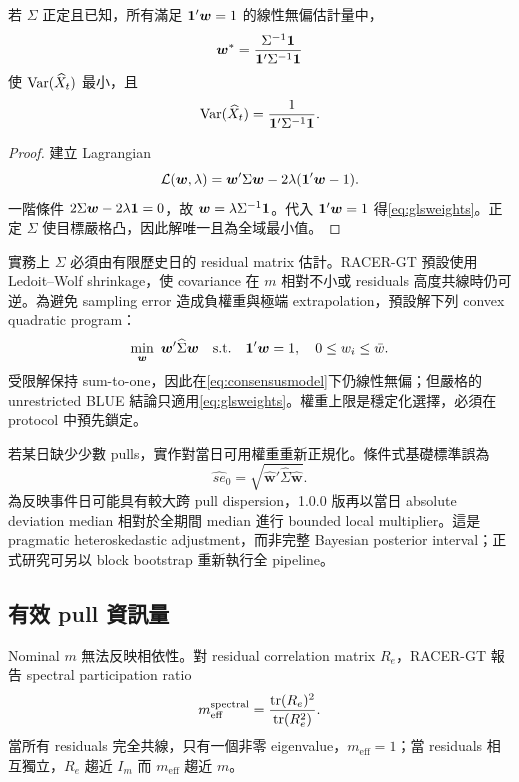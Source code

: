 \documentclass[12pt,a4paper,oneside]{article}
\begin{document}
\begin{proposition}[GLS 共識]
若 $\Sigma$ 正定且已知，所有滿足 $\bm{1}'\bm w=1$ 的線性無偏估計量中，
\begin{equation}
\bm w^*=\frac{\Sigma^{-1}\bm{1}}{\bm{1}'\Sigma^{-1}\bm{1}}
\label{eq:glsweights}
\end{equation}
使 $\operatorname{Var}(\widehat X_t)$ 最小，且
\begin{equation}
\operatorname{Var}(\widehat X_t)=\frac{1}{\bm{1}'\Sigma^{-1}\bm{1}}.
\end{equation}
\end{proposition}

\begin{proof}
建立 Lagrangian
\[
\mathcal{L}(\bm w,\lambda)=\bm w'\Sigma\bm w-2\lambda(\bm{1}'\bm w-1).
\]
一階條件 $2\Sigma\bm w-2\lambda\bm{1}=0$，故 $\bm w=\lambda\Sigma^{-1}\bm{1}$。代入 $\bm{1}'\bm w=1$ 得\cref{eq:glsweights}。正定 $\Sigma$ 使目標嚴格凸，因此解唯一且為全域最小值。
\end{proof}

實務上 $\Sigma$ 必須由有限歷史日的 residual matrix 估計。RACER-GT 預設使用 Ledoit--Wolf shrinkage，使 covariance 在 $m$ 相對不小或 residuals 高度共線時仍可逆。為避免 sampling error 造成負權重與極端 extrapolation，預設解下列 convex quadratic program：
\begin{equation}
\min_{\bm w}\ \bm w'\widehat\Sigma\bm w
\quad\text{s.t.}\quad
\bm{1}'\bm w=1,\quad 0\le w_i\le \bar w.
\label{eq:constrainedweights}
\end{equation}
受限解保持 sum-to-one，因此在\cref{eq:consensusmodel}下仍線性無偏；但嚴格的 unrestricted BLUE 結論只適用\cref{eq:glsweights}。權重上限是穩定化選擇，必須在 protocol 中預先鎖定。

若某日缺少少數 pulls，實作對當日可用權重重新正規化。條件式基礎標準誤為
\begin{equation}
\widehat{se}_0=\sqrt{\widehat{\bm w}'\widehat\Sigma\widehat{\bm w}}.
\end{equation}
為反映事件日可能具有較大跨 pull dispersion，1.0.0 版再以當日 absolute deviation median 相對於全期間 median 進行 bounded local multiplier。這是 pragmatic heteroskedastic adjustment，而非完整 Bayesian posterior interval；正式研究可另以 block bootstrap 重新執行全 pipeline。

\subsection{有效 pull 資訊量}

Nominal $m$ 無法反映相依性。對 residual correlation matrix $R_e$，RACER-GT 報告 spectral participation ratio
\begin{equation}
m_{\mathrm{eff}}^{\mathrm{spectral}}
=\frac{\operatorname{tr}(R_e)^2}{\operatorname{tr}(R_e^2)}.
\label{eq:spectraleff}
\end{equation}
當所有 residuals 完全共線，只有一個非零 eigenvalue，$m_{\mathrm{eff}}=1$；當 residuals 相互獨立，$R_e$ 趨近 $I_m$ 而 $m_{\mathrm{eff}}$ 趨近 $m$。
\end{document}
